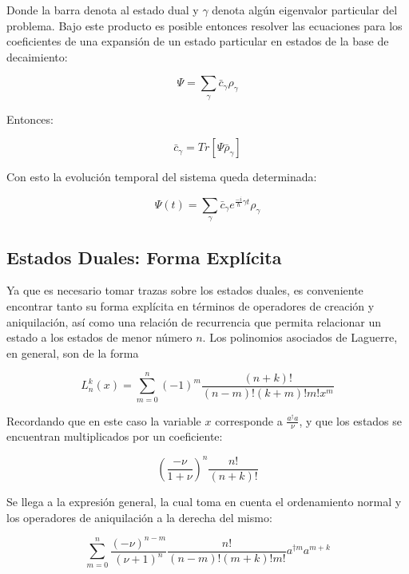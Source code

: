 \documentclass[a4paper,10pt]{report}
\begin{document}
Donde la barra denota al estado dual y $\gamma$ denota algún eigenvalor particular del problema. Bajo este producto es posible entonces resolver las ecuaciones para los coeficientes de una expansión de un estado particular en estados de la base de decaimiento:

\begin{equation}
\Psi = \sum_{\gamma}\bar{c}_\gamma \rho_\gamma
\end{equation}

Entonces:

\begin{equation}
\bar{c}_\gamma = Tr[\Psi\bar{\rho}_{\gamma}]
\end{equation}

Con esto la evolución temporal del sistema queda determinada:

\begin{equation}
\Psi(t) = \sum_\gamma \bar{c}_\gamma e^{\frac{-i}{\hbar} \gamma t} \rho_{\gamma}
\end{equation}

\subsection{Estados Duales: Forma Explícita}

Ya que es necesario tomar trazas sobre los estados duales, es conveniente encontrar tanto su forma explícita en términos de operadores de creación y aniquilación, así como una relación de recurrencia que permita relacionar un estado a los estados de menor número $n$. Los polinomios asociados de Laguerre, en general, son de la forma\cite{ArfkenMM}

\begin{equation}\label{DefLaguerre}
L_n^k(x) = \sum_{m=0}^n (-1)^m \frac{(n+k)!}{(n-m)!(k+m)!m! x^m}
\end{equation}

Recordando que en este caso la variable $x$ corresponde a $\frac{a^\dagger a}{\nu}$, y que los estados se encuentran multiplicados por un coeficiente:

\begin{equation}
(\frac{-\nu}{1+\nu})^n \frac{n!}{(n+k)!}
\end{equation}

Se llega a la expresión general, la cual toma en cuenta el ordenamiento normal y los operadores de aniquilación a la derecha del mismo:

\begin{equation}\label{DefDual}
\sum_{m=0}^n \frac{(-\nu)^{n-m}}{(\nu+1)^n} \frac{n!}{(n-m)!(m+k)!m!} a^{\dagger m}a^{m+k}
\end{equation}
\end{document}
